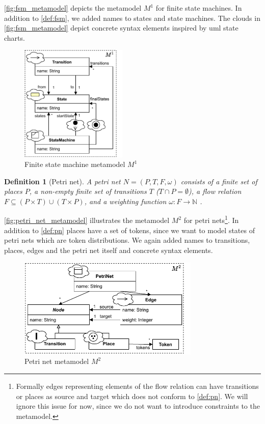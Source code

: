 \documentclass[conference]{IEEEtran}
\newtheorem{definition}{Definition}
\begin{document}
\autoref{fig:fsm_metamodel} depicts the metamodel $M^1$ for finite state machines.
In addition to \autoref{def:fsm}, we added names to states and state machines.
The clouds in \autoref{fig:fsm_metamodel} depict concrete syntax elements inspired by \gls{uml} state charts.

\begin{figure}[h]
    \centering
    \includegraphics[width=2in]{state_machine_metamodel}
    \caption{Finite state machine metamodel $M^1$}
    \label{fig:fsm_metamodel}
\end{figure}

\begin{definition}[Petri net] \label{def:pn}
    A petri net $N=(P,T,F, \omega)$ consists of a finite set of places $P$, a non-empty finite set of transitions $T$ ($T \cap P = \emptyset $), a flow relation $F \subseteq (P \times T) \cup (T \times P)$, and a weighting function $\omega: F \to \mathbb{N}$ \cite{kunzeBehaviouralModelsModelling2016}. %
\end{definition}

\autoref{fig:petri_net_metamodel} illustrates the metamodel $M^2$ for petri nets\footnote{Formally edges representing elements of the flow relation can have transitions or places as source and target which does not conform to \autoref{def:pn}.
We will ignore this issue for now, since we do not want to introduce constraints to the metamodel.}.
In addition to \autoref{def:pn} places have a set of tokens, since we want to model states of petri nets which are token distributions.
We again added names to transitions, places, edges and the petri net itself and concrete syntax elements. 

\begin{figure}[h]
    \centering
    \includegraphics[width=3.4in]{petri_net_metamodel}
    \caption{Petri net metamodel $M^2$}
    \label{fig:petri_net_metamodel}
\end{figure}
\end{document}
